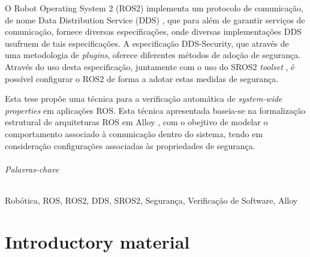 \documentclass[
  oneside,
  11pt, a4paper,
  footinclude=true,
  headinclude=true,
  cleardoublepage=empty
]{scrbook}
\begin{document}
	O Robot Operating System 2 (ROS2) implementa um protocolo de comunicação, de nome Data Distribution Service (DDS) \cite{3}, que para além de garantir serviços de comunicação, fornece diversas especificações, onde diversas implementações DDS usufruem de tais especificações. A especificação DDS-Security, que através de uma metodologia de \textit{plugins}, oferece diferentes métodos de adoção de segurança. Através do uso desta especificação, juntamente com o uso do SROS2 \textit{toolset} \cite{ros-dds-integration}, é possível configurar o ROS2 de forma a adotar estas medidas de segurança.

	Esta tese propõe uma técnica para a verificação automática de \textit{system-wide properties} em aplicações ROS. Esta técnica apresentada baseia-se na formalização estrutural de arquiteturas ROS em Alloy \cite{alloy-6}, com o obejtivo de modelar o comportamento associado à comunicação dentro do sistema, tendo em consideração configurações associadas às propriedades de segurança. 
	
	
\paragraph{Palavras-chave} Robótica, ROS, ROS2, DDS, SROS2, Segurança, Verificação de Software, Alloy


	\cleardoublepage

	\setcounter{page}{3}

	\cleardoublepage
	\tableofcontents

	\cleardoublepage
	\listoffigures



	\cleardoublepage
	\setcounter{page}{3}

\part{Introductory material}












\end{document}
